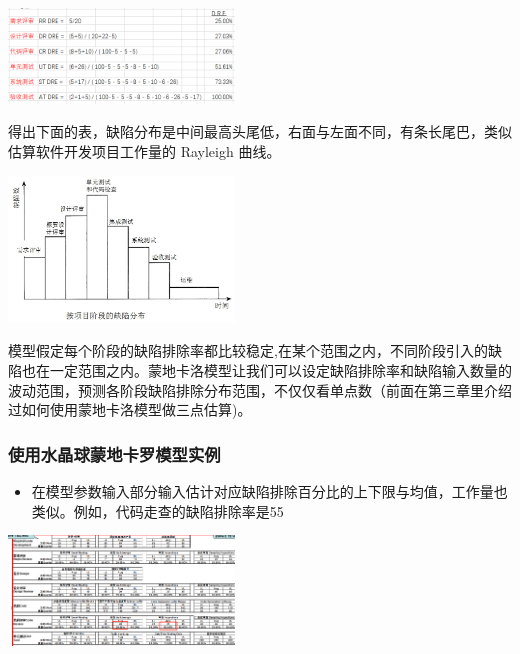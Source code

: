 \includegraphics[width=6cm]{1113corrDreScreenshot_2021-11-13_212509.png}

得出下面的表，缺陷分布是中间最高头尾低，右面与左面不同，有条长尾巴，类似估算软件开发项目工作量的
Rayleigh 曲线。

\includegraphics[width=6cm]{jalote_emm_72-1.jpg}

模型假定每个阶段的缺陷排除率都比较稳定,在某个范围之内，不同阶段引入的缺陷也在一定范围之内。蒙地卡洛模型让我们可以设定缺陷排除率和缺陷输入数量的波动范围，预测各阶段缺陷排除分布范围，不仅仅看单点数（前面在第三章里介绍过如何使用蒙地卡洛模型做三点估算)。

\hypertarget{ux57f9ux8badux5bf9ux8c61}{%
\subsubsection{使用水晶球蒙地卡罗模型实例}\label{ux57f9ux8badux5bf9ux8c61}}

\begin{itemize}
\tightlist
\item
  在模型参数输入部分输入估计对应缺陷排除百分比的上下限与均值，工作量也类似。例如，代码走查的缺陷排除率是55%

\end{itemize}

\includegraphics[width=6cm]{微信截图_20211027011246.png}

